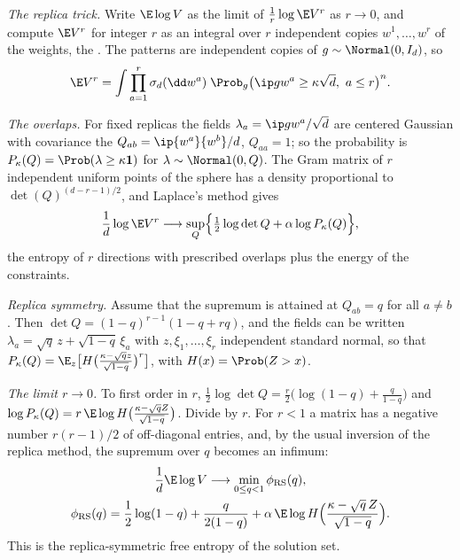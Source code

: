 \begin{refsection}
\begin{heuristic}
\emph{The replica trick.} Write $\E\log V$ as the limit of $\frac1r\log\E V^r$ as $r\to0$, and compute $\E V^r$ for integer $r$ as an integral over $r$ independent copies $w^1,\dots,w^r$ of the weights, the . The patterns are independent copies of $g\sim\Normal(0,I_d)$, so
\[
\E V^r=\int\prod_{a=1}^r\sigma_d(\dd w^a)\;\Prob_g\bigl(\ip g{w^a}\ge\kappa\sqrt d,\ a\le r\bigr)^{n}.
\]

\emph{The overlaps.} For fixed replicas the fields $\lambda_a=\ip g{w^a}/\sqrt d$ are centered Gaussian with covariance the  $Q_{ab}=\ip{w^a}{w^b}/d$, $Q_{aa}=1$; so the probability is $P_\kappa(Q)=\Prob(\lambda\ge\kappa\mathbf 1)$ for $\lambda\sim\Normal(0,Q)$. The Gram matrix of $r$ independent uniform points of the sphere has a density proportional to $\det(Q)^{(d-r-1)/2}$, and Laplace's method gives
\[
\frac1d\log\E V^r\longrightarrow\sup_Q\Bigl\{\tfrac12\log\det Q+\alpha\log P_\kappa(Q)\Bigr\},
\]
the entropy of $r$ directions with prescribed overlaps plus the energy of the constraints.

\emph{Replica symmetry.} Assume that the supremum is attained at $Q_{ab}=q$ for all $a\ne b$. Then $\det Q=(1-q)^{r-1}(1-q+rq)$, and the fields can be written $\lambda_a=\sqrt q\,z+\sqrt{1-q}\,\xi_a$ with $z,\xi_1,\dots,\xi_r$ independent standard normal, so that $P_\kappa(Q)=\E_z\bigl[H\bigl(\frac{\kappa-\sqrt qz}{\sqrt{1-q}}\bigr)^r\bigr]$, with $H(x)=\Prob(Z>x)$.

\emph{The limit $r\to0$.} To first order in $r$, $\frac12\log\det Q=\frac r2\bigl(\log(1-q)+\frac q{1-q}\bigr)$ and $\log P_\kappa(Q)=r\,\E\log H\bigl(\frac{\kappa-\sqrt qZ}{\sqrt{1-q}}\bigr)$. Divide by $r$. For $r<1$ a matrix has a negative number $r(r-1)/2$ of off-diagonal entries, and, by the usual inversion of the replica method, the supremum over $q$ becomes an infimum:
\begin{equation}\label{eq:gordon:phiRS}
\begin{gathered}
\frac1d\E\log V\longrightarrow\min_{0\le q<1}\phi_{\mathrm{RS}}(q),\\
\phi_{\mathrm{RS}}(q)=\frac12\log(1-q)+\frac q{2(1-q)}+\alpha\,\E\log H\Bigl(\frac{\kappa-\sqrt q\,Z}{\sqrt{1-q}}\Bigr).
\end{gathered}
\end{equation}
This is the replica-symmetric free entropy of the solution set.
\end{heuristic}


\end{refsection}
